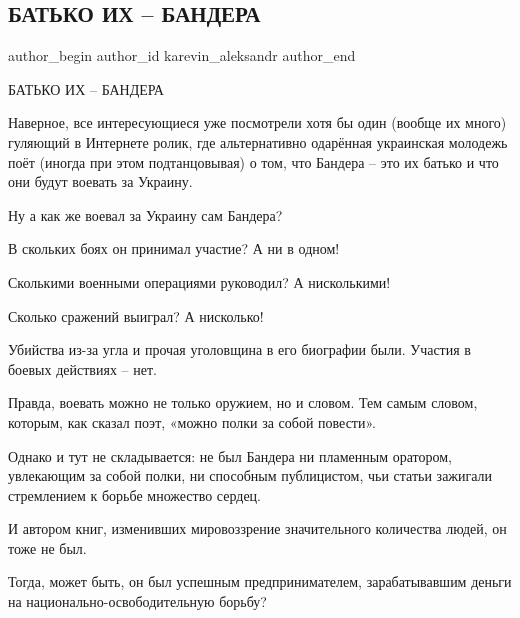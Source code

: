  
 
 
 
 
 
\subsection{БАТЬКО ИХ – БАНДЕРА}
\label{sec:21_10_2021.fb.karevin_aleksandr.1.batjko_bandera}
 
\ifcmt
 author_begin
   author_id karevin_aleksandr
 author_end
\fi

БАТЬКО ИХ – БАНДЕРА

Наверное, все интересующиеся уже посмотрели хотя бы один (вообще их много)
гуляющий в Интернете ролик, где альтернативно одарённая украинская молодежь
поёт (иногда при этом подтанцовывая) о том, что Бандера – это их батько и что
они будут воевать за Украину.

Ну а как же воевал за Украину сам Бандера?

В скольких боях он принимал участие? А ни в одном!

Сколькими военными операциями руководил? А нисколькими!

Сколько сражений выиграл? А нисколько!

Убийства из-за угла и прочая уголовщина в его биографии были. Участия в боевых
действиях – нет.

Правда, воевать можно не только оружием, но и словом. Тем самым словом,
которым, как сказал поэт, «можно полки за собой повести».

Однако и тут не складывается: не был Бандера ни пламенным оратором, увлекающим
за собой полки, ни способным публицистом, чьи статьи зажигали стремлением к
борьбе множество сердец.

И автором книг, изменивших мировоззрение значительного количества людей, он
тоже не был.

Тогда, может быть, он был успешным предпринимателем, зарабатывавшим деньги на
национально-освободительную борьбу?

